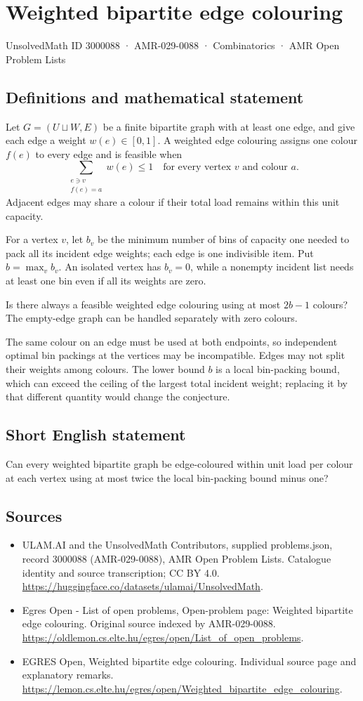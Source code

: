 \documentclass[11pt,a4paper]{article}
\begin{document}
\section*{Weighted bipartite edge colouring}\label{3000088}
{\small UnsolvedMath ID 3000088 · AMR-029-0088 · Combinatorics · AMR Open Problem Lists}
\subsection{Definitions and mathematical statement}
Let $G=(U\sqcup W,E)$ be a finite bipartite graph with at least
one edge, and give each edge a weight $w(e)\in[0,1]$.
A weighted edge colouring assigns one colour $f(e)$ to every edge
and is feasible when
\[
                       \sum_{\substack{e\ni v\\f(e)=a}}w(e)\le1
                                 \quad\text{for every vertex }v
                                 \text{ and colour }a.
\]
Adjacent edges may share a colour if their total load remains
within this unit capacity.

For a vertex $v$, let $b_v$ be the minimum number of bins of
capacity one needed to pack all its incident edge weights;
each edge is one indivisible item. Put $b=\max_v b_v$.
An isolated vertex has $b_v=0$, while a nonempty incident list
needs at least one bin even if all its weights are zero.

Is there always a feasible weighted edge colouring using at most
$2b-1$ colours? The empty-edge graph can be handled separately
with zero colours.

The same colour on an edge must be used at both endpoints,
so independent optimal bin packings at the vertices may be
incompatible. Edges may not split their weights among colours.
The lower bound $b$ is a local bin-packing bound, which can
exceed the ceiling of the largest total incident weight; replacing
it by that different quantity would change the conjecture.
\subsection{Short English statement}
Can every weighted bipartite graph be edge-coloured within unit
load per colour at each vertex using at most twice the local bin-packing bound minus one?
\subsection{Sources}
\begin{itemize}
\item[S1] ULAM.AI and the UnsolvedMath Contributors, supplied problems.json, record 3000088 (AMR-029-0088), AMR Open Problem Lists. Catalogue identity and source transcription; CC BY 4.0.
\url{https://huggingface.co/datasets/ulamai/UnsolvedMath}.
\item[S2] Egres Open - List of open problems, Open-problem page: Weighted bipartite edge colouring. Original source indexed by AMR-029-0088.
\url{https://oldlemon.cs.elte.hu/egres/open/List_of_open_problems}.
\item[S3] EGRES Open, Weighted bipartite edge colouring. Individual source page and explanatory remarks.
\url{https://lemon.cs.elte.hu/egres/open/Weighted_bipartite_edge_colouring}.
\end{itemize}
\end{document}
